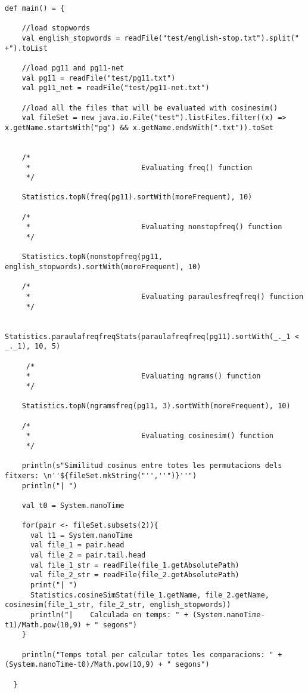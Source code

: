 \documentclass{report}
\begin{document}
\begin{lstlisting}[style=scalaHighlight]
def main() = {

    //load stopwords
    val english_stopwords = readFile("test/english-stop.txt").split(" +").toList

    //load pg11 and pg11-net
    val pg11 = readFile("test/pg11.txt")
    val pg11_net = readFile("test/pg11-net.txt")

    //load all the files that will be evaluated with cosinesim()
    val fileSet = new java.io.File("test").listFiles.filter((x) => x.getName.startsWith("pg") && x.getName.endsWith(".txt")).toSet


    /*
     * 							Evaluating freq() function
     */

    Statistics.topN(freq(pg11).sortWith(moreFrequent), 10)

    /*
     * 							Evaluating nonstopfreq() function
     */

    Statistics.topN(nonstopfreq(pg11, english_stopwords).sortWith(moreFrequent), 10)

    /*
     * 							Evaluating paraulesfreqfreq() function
     */

    Statistics.paraulafreqfreqStats(paraulafreqfreq(pg11).sortWith(_._1 < _._1), 10, 5)

     /*
     * 							Evaluating ngrams() function
     */

    Statistics.topN(ngramsfreq(pg11, 3).sortWith(moreFrequent), 10)

    /*
     * 							Evaluating cosinesim() function
     */

    println(s"Similitud cosinus entre totes les permutacions dels fitxers: \n''${fileSet.mkString("'',''")}''")
    println("| ")

    val t0 = System.nanoTime

    for(pair <- fileSet.subsets(2)){
      val t1 = System.nanoTime
      val file_1 = pair.head
      val file_2 = pair.tail.head
      val file_1_str = readFile(file_1.getAbsolutePath)
      val file_2_str = readFile(file_2.getAbsolutePath)
      print("| ")
      Statistics.cosineSimStat(file_1.getName, file_2.getName, cosinesim(file_1_str, file_2_str, english_stopwords))
      println("|	Calculada en temps: " + (System.nanoTime-t1)/Math.pow(10,9) + " segons")
    }

    println("Temps total per calcular totes les comparacions: " + (System.nanoTime-t0)/Math.pow(10,9) + " segons")

  }
\end{lstlisting}
\end{document}
